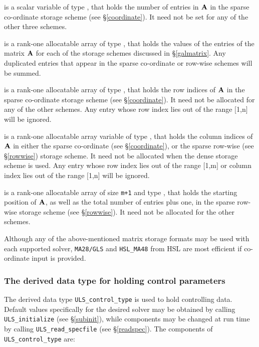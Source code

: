 \documentclass{galahad}
\newcommand{\packagename}{ULS}
\begin{document}
\begin{description}
 is a scalar variable of type \integer, that
holds the number of entries in ${\mathbf{A}}$
in the sparse co-ordinate storage scheme (see \S\ref{coordinate}).
It need not be set for any of the other three schemes.

 is a rank-one allocatable array of type \realdp, that holds
the values of the entries of the matrix ${\mathbf{A}}$ for each of the
storage schemes discussed in \S\ref{galmatrix}.
Any duplicated entries that appear in the sparse
co-ordinate or row-wise schemes will be summed.

 is a rank-one allocatable array of type \integer,
that holds the row indices of ${\mathbf{A}}$ in the sparse co-ordinate storage
scheme (see \S\ref{coordinate}).
It need not be allocated for any of the other schemes.
Any entry whose row index lies out of the range $[$1,n$]$ will be ignored.

 is a rank-one allocatable array variable of type \integer,
that holds the column indices of ${\mathbf{A}}$ in either the sparse co-ordinate
(see \S\ref{coordinate}), or the sparse row-wise
(see \S\ref{rowwise}) storage scheme.
It need not be allocated when the dense
storage scheme is used.
Any entry whose row index lies out of the range $[$1,m$]$ or
column index lies out of the range $[$1,n$]$ will be ignored.

 is a rank-one allocatable array of size {\tt m+1} and type
\integer, that holds the starting position of ${\mathbf{A}}$, as well
as the total number of entries plus one, in the sparse row-wise storage
scheme (see \S\ref{rowwise}). It need not be allocated for the
other schemes.

\end{description}
Although any of the above-mentioned matrix storage formats may be used
with each supported solver, {\tt MA28/GLS} and {\tt HSL\_MA48}
from HSL are most efficient if co-ordinate input is provided.


\subsubsection{The derived data type for holding control
 parameters}\label{typecontrol}
The derived data type
{\tt \packagename\_control\_type}
is used to hold controlling data.
Default values specifically for the desired solver
may be obtained by calling
{\tt \packagename\_initialize}
(see \S\ref{subinit}),
while components may be changed at run time by calling
{\tt \packagename\_read\-\_specfile}
(see \S\ref{readspec}).
The components of
{\tt \packagename\_control\_type}
are:
\end{document}

